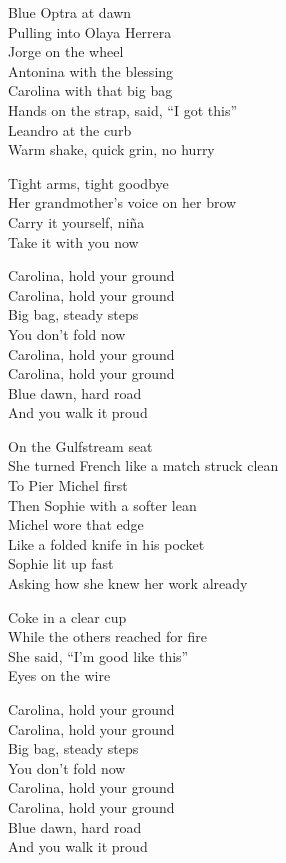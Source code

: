 \begin{lyrics}
Blue Optra at dawn\\
Pulling into Olaya Herrera\\
Jorge on the wheel\\
Antonina with the blessing\\
Carolina with that big bag\\
Hands on the strap, said, “I got this”\\
Leandro at the curb\\
Warm shake, quick grin, no hurry

Tight arms, tight goodbye\\
Her grandmother’s voice on her brow\\
Carry it yourself, niña\\
Take it with you now

Carolina, hold your ground\\
Carolina, hold your ground\\
Big bag, steady steps\\
You don’t fold now\\
Carolina, hold your ground\\
Carolina, hold your ground\\
Blue dawn, hard road\\
And you walk it proud

On the Gulfstream seat\\
She turned French like a match struck clean\\
To Pier Michel first\\
Then Sophie with a softer lean\\
Michel wore that edge\\
Like a folded knife in his pocket\\
Sophie lit up fast\\
Asking how she knew her work already

Coke in a clear cup\\
While the others reached for fire\\
She said, “I’m good like this”\\
Eyes on the wire

Carolina, hold your ground\\
Carolina, hold your ground\\
Big bag, steady steps\\
You don’t fold now\\
Carolina, hold your ground\\
Carolina, hold your ground\\
Blue dawn, hard road\\
And you walk it proud


\end{lyrics}
